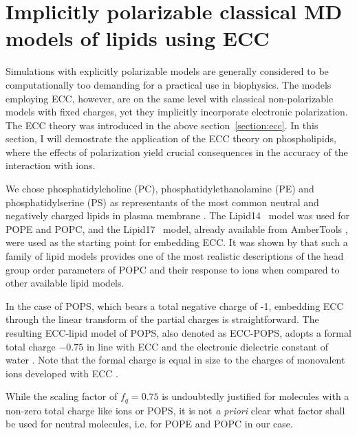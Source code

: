  

 
 



\section{Implicitly polarizable classical MD models of lipids using ECC}

Simulations with explicitly polarizable models are generally considered to be computationally too demanding for a practical use in biophysics. 
The models employing ECC, however, are on the same level with classical non-polarizable models with fixed charges, yet they implicitly incorporate electronic polarization. 
The ECC theory was introduced in the above section~\ref{section:ecc}.
In this section, I will demostrate the application of the ECC theory on phospholipids, 
where the effects of polarization yield crucial consequences in the accuracy of the interaction with ions. 

We chose phosphatidylcholine (PC), phosphatidylethanolamine (PE) and phosphatidylserine (PS)
as representants of the most common neutral and negatively charged lipids in plasma membrane \citep{the_review_with_pie_charts_on_my_desk, marsh13}. 
The Lipid14~\citep{dickson14} model was used for POPE and POPC,
and the Lipid17~\citep{lipid17} model, already available from AmberTools \citep{ferrer13},
were used as the starting point for embedding ECC.
It was shown by \citet{botan15, catte16} that such a family of lipid models provides one of the most 
realistic descriptions of the head group order parameters of POPC and their response to ions 
when compared to other available lipid models. 

In the case of POPS, which bears a total negative charge of -1, 
embedding ECC through the linear transform of the partial charges is straightforward. 
The resulting ECC-lipid model of POPS, also denoted as ECC-POPS, 
adopts a formal total charge $-0.75$ in line with ECC and the electronic dielectric constant of water \citep{leontyev14}. 
Note that the formal charge is equal in size to the charges of monovalent ions developed with ECC \citep{Pluharova2014, kohagen14, kohagen16, martinek17}.

While the scaling factor of $f_q = 0.75$ is undoubtedly justified for molecules with a non-zero total charge like ions or POPS,
it is not \emph{a priori} clear what factor shall be used for neutral molecules, i.e. for POPE and POPC in our case.

